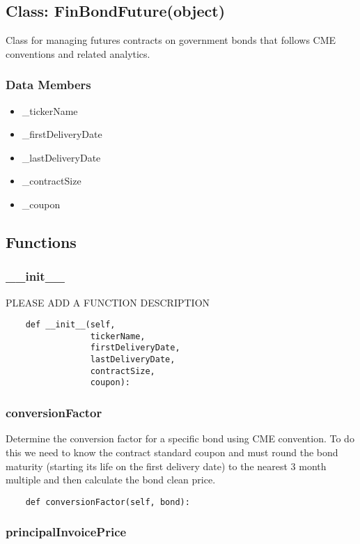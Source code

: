 \documentclass[twoside,11pt]{book}
\begin{document}
\subsection*{Class: FinBondFuture(object)}
Class for managing futures contracts on government bonds that follows CME conventions and related analytics.  

\subsubsection*{Data Members}
\begin{itemize}
\item{\_tickerName}
\item{\_firstDeliveryDate}
\item{\_lastDeliveryDate}
\item{\_contractSize}
\item{\_coupon}
\end{itemize}

\subsection*{Functions}

\subsubsection*{{\bf \_\_init\_\_}}
PLEASE ADD A FUNCTION DESCRIPTION

\begin{lstlisting}
    def __init__(self,
                 tickerName,
                 firstDeliveryDate,
                 lastDeliveryDate,
                 contractSize,
                 coupon):
\end{lstlisting}

\subsubsection*{{\bf conversionFactor}}
Determine the conversion factor for a specific bond using CME convention. To do this we need to know the contract standard coupon and must round the bond maturity (starting its life on the first delivery date) to the nearest 3 month multiple and then calculate the bond clean price.  

\begin{lstlisting}
    def conversionFactor(self, bond):
\end{lstlisting}

\subsubsection*{{\bf principalInvoicePrice}}
\end{document}
